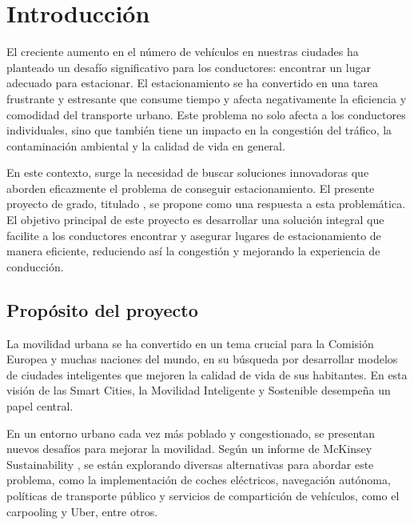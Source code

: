 \newpage
\section{Introducción}
El creciente aumento en el número de vehículos en nuestras ciudades ha planteado un desafío significativo para los conductores: encontrar un lugar adecuado para estacionar. El estacionamiento se ha convertido en una tarea frustrante y estresante que consume tiempo y afecta negativamente la eficiencia y comodidad del transporte urbano. Este problema no solo afecta a los conductores individuales, sino que también tiene un impacto en la congestión del tráfico, la contaminación ambiental y la calidad de vida en general.

En este contexto, surge la necesidad de buscar soluciones innovadoras que aborden eficazmente el problema de conseguir estacionamiento. El presente proyecto de grado, titulado , se propone como una respuesta a esta problemática. El objetivo principal de este proyecto es desarrollar una solución integral que facilite a los conductores encontrar y asegurar lugares de estacionamiento de manera eficiente, reduciendo así la congestión y mejorando la experiencia de conducción.

 
\subsection{Propósito del proyecto}
La movilidad urbana se ha convertido en un tema crucial para la Comisión Europea y muchas naciones del mundo, en su búsqueda por desarrollar modelos de ciudades inteligentes que mejoren la calidad de vida de sus habitantes. En esta visión de las Smart Cities, la Movilidad Inteligente y Sostenible desempeña un papel central.

En un entorno urbano cada vez más poblado y congestionado, se presentan nuevos desafíos para mejorar la movilidad. Según un informe de McKinsey Sustainability \cite{ref1}, se están explorando diversas alternativas para abordar este problema, como la implementación de coches eléctricos, navegación autónoma, políticas de transporte público y servicios de compartición de vehículos, como el carpooling y Uber, entre otros.

